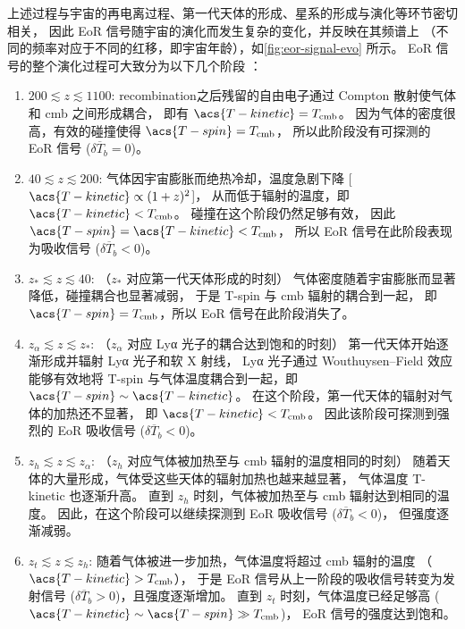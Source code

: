 上述过程与宇宙的再电离过程、第一代天体的形成、星系的形成与演化等环节密切相关，
因此 EoR 信号随宇宙的演化而发生复杂的变化，并反映在其频谱上
（不同的频率对应于不同的红移，即宇宙年龄），如\autoref{fig:eor-signal-evo} 所示。
EoR 信号的整个演化过程可大致分为以下几个阶段 \cite{pritchard2012}：
\begin{enumerate}
  \item $200 \lesssim z \lesssim 1100$:
    \ac{recombination}之后残留的自由电子通过 Compton 散射使气体
    和 \ac{cmb} 之间形成耦合，
    即有 $\acs{T-kinetic} = T_{\R{cmb}}$。
    因为气体的密度很高，有效的碰撞使得 $\acs{T-spin} = T_{\R{cmb}}$，
    所以此阶段没有可探测的 EoR 信号 ($\delta\overline{T}_b = 0$)。

  \item $40 \lesssim z \lesssim 200$:
    气体因宇宙膨胀而绝热冷却，温度急剧下降 [$\acs{T-kinetic} \propto (1+z)^2$]，
    从而低于辐射的温度，即 $\acs{T-kinetic} < T_{\R{cmb}}$。
    碰撞在这个阶段仍然足够有效，
    因此 $\acs{T-spin} = \acs{T-kinetic} < T_{\R{cmb}}$，
    所以 EoR 信号在此阶段表现为吸收信号 ($\delta\overline{T}_b < 0$)。

  \item $z_* \lesssim z \lesssim 40$:
    （$z_*$ 对应第一代天体形成的时刻）
    气体密度随着宇宙膨胀而显著降低，碰撞耦合也显著减弱，
    于是 \acs{T-spin} 与 \ac{cmb} 辐射的耦合到一起，
    即 $\acs{T-spin} = T_{\R{cmb}}$，所以 EoR 信号在此阶段消失了。

  \item $z_{\alpha} \lesssim z \lesssim z_*$:
    （$z_{\alpha}$ 对应 Lyα 光子的耦合达到饱和的时刻）
    第一代天体开始逐渐形成并辐射 Lyα 光子和软 X 射线，
    Lyα 光子通过 Wouthuysen--Field 效应能够有效地将 \acs{T-spin}
    与气体温度耦合到一起，即 $\acs{T-spin} \sim \acs{T-kinetic}$。
    在这个阶段，第一代天体的辐射对气体的加热还不显著，
    即 $\acs{T-kinetic} < T_{\R{cmb}}$。
    因此该阶段可探测到强烈的 EoR 吸收信号 ($\delta\overline{T}_b < 0$)。

  \item $z_h \lesssim z \lesssim z_{\alpha}$:
    （$z_h$ 对应气体被加热至与 \ac{cmb} 辐射的温度相同的时刻）
    随着天体的大量形成，气体受这些天体的辐射加热也越来越显著，
    气体温度 \acs{T-kinetic} 也逐渐升高。
    直到 $z_h$ 时刻，气体被加热至与 \ac{cmb} 辐射达到相同的温度。
    因此，在这个阶段可以继续探测到 EoR 吸收信号 ($\delta\overline{T}_b < 0$)，
    但强度逐渐减弱。

  \item $z_t \lesssim z \lesssim z_h$:
    随着气体被进一步加热，气体温度将超过 \ac{cmb} 辐射的温度
    （$\acs{T-kinetic} > T_{\R{cmb}}$），
    于是 EoR 信号从上一阶段的吸收信号转变为发射信号 
    ($\delta\overline{T}_b > 0$)，且强度逐渐增加。
    直到 $z_t$ 时刻，气体温度已经足够高
    ($\acs{T-kinetic} \sim \acs{T-spin} \gg T_{\R{cmb}}$)，
    EoR 信号的强度达到饱和。


\end{enumerate}
